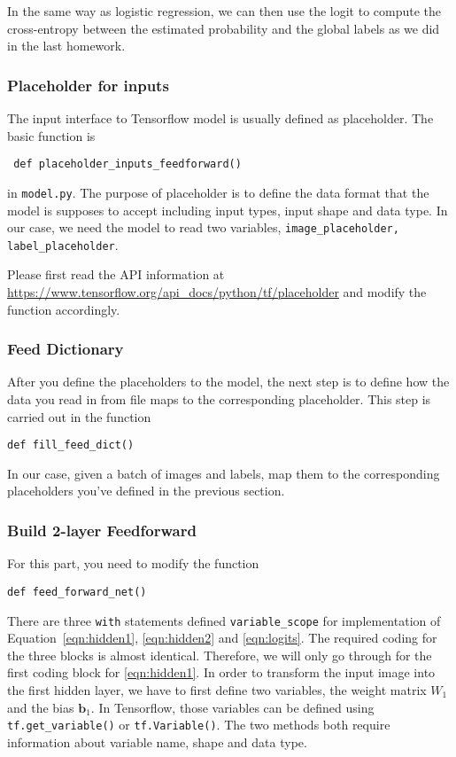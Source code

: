 \documentclass[letterpaper]{article}
\providecommand{\bvec}{\textbf{b}}
\begin{document}
In the same way as logistic regression, we can then use the logit to compute the
cross-entropy between the estimated probability and the global labels as we did
in the last homework.

\subsubsection{Placeholder for inputs}
The input interface to Tensorflow model is usually defined as placeholder.  The
basic function is \begin{verbatim} def placeholder_inputs_feedforward()
\end{verbatim} in \verb|model.py|.
The purpose of placeholder is to define the data format that the model is
supposes to accept including input types, input shape and data type. In our
case, we need the model to read two variables,
\verb|image_placeholder, label_placeholder|.

Please first read the API information at
\url{https://www.tensorflow.org/api_docs/python/tf/placeholder} and modify the
function accordingly.

\subsubsection{Feed Dictionary}
After you define the placeholders to the model, the next step is to define how
the data you read in from file maps to the corresponding placeholder. This step
is carried out in the function 
\begin{verbatim}
def fill_feed_dict()
\end{verbatim}
In our case, given a batch of images and labels, map them to the corresponding
placeholders you've defined in the previous section.

\subsubsection{Build 2-layer Feedforward}
For this part, you need to modify the function
\begin{verbatim}
def feed_forward_net()
\end{verbatim}
There are three \verb|with| statements defined \verb|variable_scope| for
implementation of Equation~\eqref{eqn:hidden1}, \eqref{eqn:hidden2} and
\eqref{eqn:logits}. The required coding for the three blocks is almost
identical. Therefore, we will only go through for the first coding block
for \eqref{eqn:hidden1}. In order to transform the input image into the first
hidden layer, we have to first define two variables, the weight matrix
$W_1$ and the bias $\bvec_1$. In Tensorflow, those variables can be defined
using \verb|tf.get_variable()| or \verb|tf.Variable()|. The two methods both
require information about variable name, shape and data type.
\end{document}

